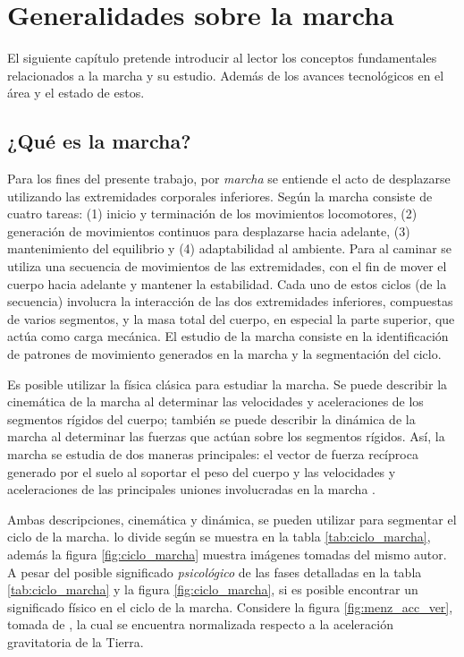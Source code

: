 \chapter[Generalidades]{Generalidades sobre la marcha}
\label{generalidades}

El siguiente capítulo pretende introducir al lector los conceptos fundamentales relacionados a la marcha y su estudio. Además de los avances tecnológicos en el área y el estado de estos.

\section{¿Qué es la marcha?}

Para los fines del presente trabajo, por \emph{marcha} se entiende el acto de desplazarse utilizando las extremidades corporales inferiores. Según \cite{menz} la marcha consiste de cuatro tareas: (1) inicio y terminación de los movimientos locomotores, (2) generación de movimientos continuos para desplazarse hacia adelante, (3) mantenimiento del equilibrio y (4) adaptabilidad al ambiente. Para \cite{perry} al caminar se utiliza una secuencia de movimientos de las extremidades, con el fin de mover el cuerpo hacia adelante y mantener la estabilidad. Cada uno de estos ciclos (de la secuencia) involucra la interacción de las dos extremidades inferiores, compuestas de varios segmentos, y la masa total del cuerpo, en especial la parte superior, que actúa como carga mecánica. El estudio de la marcha consiste en la identificación de patrones de movimiento generados en la marcha y la segmentación del ciclo.

Es posible utilizar la física clásica para estudiar la marcha. Se puede describir la cinemática de la marcha al determinar las velocidades y aceleraciones de los segmentos rígidos del cuerpo; también se puede describir la dinámica de la marcha al determinar las fuerzas que actúan sobre los segmentos rígidos. Así, la marcha se estudia de dos maneras principales: el vector de fuerza recíproca generado por el suelo al soportar el peso del cuerpo y las velocidades y aceleraciones de las principales uniones involucradas en la marcha \citep{perry}. 

Ambas descripciones, cinemática y dinámica, se pueden utilizar para segmentar el ciclo de la marcha. \cite{perry} lo divide según se muestra en la tabla \ref{tab:ciclo_marcha}, además la figura \ref{fig:ciclo_marcha} muestra imágenes tomadas del mismo autor. A pesar del posible significado \emph{psicológico} de las fases detalladas en la tabla \ref{tab:ciclo_marcha} y la figura \ref{fig:ciclo_marcha}, si es posible encontrar un significado físico en el ciclo de la marcha. Considere la figura \ref{fig:menz_acc_ver}, tomada de \citep{menz}, la cual se encuentra normalizada respecto a la aceleración gravitatoria de la Tierra.


